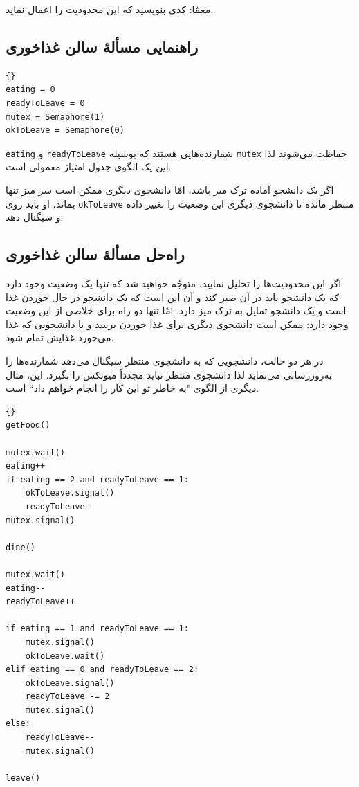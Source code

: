 \documentclass{book}
\newcommand{\clearemptydoublepage}{\newpage\cleardoublepage}
\begin{document}
    معمّا: کدی بنویسید که این محدودیت را اعمال نماید. 


\clearemptydoublepage
\subsection{راهنمایی مسألهٔ سالن غذاخوری}

\begin{latin}
\begin{lstlisting}[title=\rl{راهنمایی مسألهٔ سالن غذاخوری}]{}
eating = 0
readyToLeave = 0
mutex = Semaphore(1)
okToLeave = Semaphore(0)
\end{lstlisting}
\end{latin}

    {\tt eating} و {\tt readyToLeave}
    شمارنده‌هایی هستند که بوسیله {\tt mutex} حفاظت می‌شوند لذا این یک الگوی جدول امتیاز معمولی است. 
    

    اگر یک دانشجو آماده ترک میز باشد، امّا دانشجوی دیگری ممکن است سر میز  تنها بماند، او باید روی {\tt okToLeave}  منتظر مانده تا 
    دانشجوی دیگری این وضعیت را تغییر داده و سیگنال دهد. 


\clearemptydoublepage
\subsection{راه‌حل مسألهٔ سالن غذاخوری}

    اگر این محدودیت‌ها را تحلیل نمایید، متوجّه خواهید شد که تنها یک وضعیت وجود دارد که یک دانشجو باید در آن صبر کند و آن این است که یک 
    دانشجو در حال خوردن غذا است و یک دانشجو تمایل به ترک میز دارد. امّا تنها دو راه برای خلاصی از این وضعیت وجود دارد:
    ممکن است دانشجوی دیگری برای غذا خوردن برسد و یا دانشجویی که غذا می‌خورد غذایش تمام شود. 

    در هر دو حالت، دانشجویی که به دانشجوی منتظر سیگنال می‌دهد شمارنده‌ها را به‌روزرسانی می‌نماید لذا دانشجوی منتظر نباید مجدداً میوتکس را بگیرد. 
    این، مثال دیگری از الگوی "به خاطر تو این کار را انجام خواهم داد`` است.

\begin{latin}
\begin{lstlisting}[title=\rl{راه‌حل مسألهٔ سالن غذاخوری}]{}
getFood()

mutex.wait()
eating++
if eating == 2 and readyToLeave == 1:
    okToLeave.signal()
    readyToLeave--
mutex.signal()

dine()

mutex.wait()
eating--
readyToLeave++

if eating == 1 and readyToLeave == 1:
    mutex.signal()
    okToLeave.wait()
elif eating == 0 and readyToLeave == 2:
    okToLeave.signal()
    readyToLeave -= 2
    mutex.signal()
else:
    readyToLeave--
    mutex.signal()

leave()
\end{lstlisting}
\end{latin}
\end{document}
